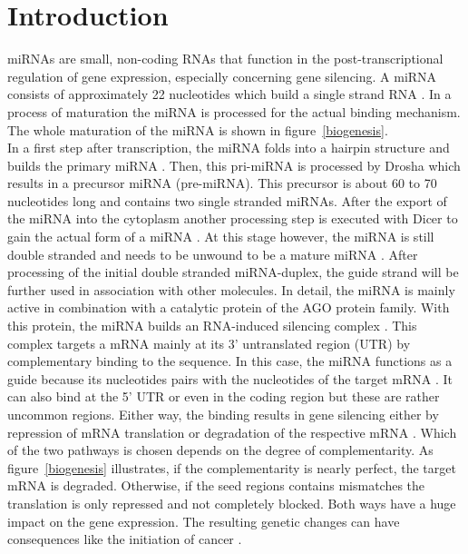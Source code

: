 \documentclass[12pt,  a4paper]{report}
\begin{document}
\newpage

\tableofcontents

\newpage 
\pagestyle{plain}





 
\vspace{1.5cm}

\newpage

\chapter{Introduction}
\label{chapter:introduction}

miRNAs are small, non-coding RNAs that function in the post-transcriptional regulation of gene expression, especially concerning gene silencing. A miRNA consists of approximately 22 nucleotides which build a single strand RNA \cite{Bartel}. In a process of maturation the miRNA is processed for the actual binding mechanism. The whole maturation of the miRNA is shown in figure~\ref{biogenesis}.\\

In a first step after transcription, the miRNA folds into a hairpin structure and builds the primary miRNA \cite{Lee}. Then, this pri-miRNA is processed by Drosha which results in a precursor miRNA (pre-miRNA). This precursor is about 60 to 70 nucleotides long and contains two single stranded miRNAs. After the export of the miRNA into the cytoplasm another processing step is executed with Dicer to gain the actual form of a miRNA \cite{Lee}. At this stage however, the miRNA is still double stranded and needs to be unwound to be a mature miRNA \cite{Macfarlane}. After processing of the initial double stranded miRNA-duplex, the guide strand will be further used in association with other molecules. In detail, the miRNA is mainly active in combination with a catalytic protein of the AGO protein family. With this protein, the miRNA builds an RNA-induced silencing complex \cite{Ha}. This complex targets a mRNA mainly at its 3' untranslated region (UTR) by complementary binding to the sequence. In this case, the miRNA functions as a guide because its nucleotides pairs with the nucleotides of the target mRNA \cite{Macfarlane}. It can also bind at the 5' UTR or even in the coding region but these are rather uncommon regions. Either way, the binding results in gene silencing either by repression of mRNA translation or degradation of the respective mRNA \cite{Enright}. Which of the two pathways is chosen depends on the degree of complementarity. As figure~\ref{biogenesis} illustrates, if the complementarity is nearly perfect, the target mRNA is degraded. Otherwise, if the seed regions contains mismatches the translation is only repressed and not completely blocked. Both ways have a huge impact on the gene expression. The resulting genetic changes can have consequences like the initiation of cancer \cite{Macfarlane}.\\
\end{document}

